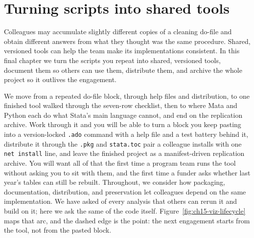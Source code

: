 \documentclass[
    a4paper,
    fontsize=10pt,
    twoside=true,
    numbers=noenddot,
]{kaobook}
\begin{document}
\chapter{Turning scripts into shared tools}\label{ch:tools}

Colleagues may accumulate slightly different copies of a cleaning do-file and obtain different answers from what they thought was the same procedure. Shared, versioned tools can help the team make its implementations consistent. In this final chapter we turn the scripts you repeat into shared, versioned tools, document them so others can use them, distribute them, and archive the whole project so it outlives the engagement.

We move from a repeated do-file block, through help files and distribution, to one finished tool walked through the seven-row checklist, then to where Mata and Python each do what Stata's main language cannot, and end on the replication archive. Work through it and you will be able to turn a block you keep pasting into a version-locked \texttt{.ado} command with a help file and a test battery behind it, distribute it through the \texttt{.pkg} and \texttt{stata.toc} pair a colleague installs with one \texttt{net install} line, and leave the finished project as a manifest-driven replication archive. You will want all of that the first time a program team runs the tool without asking you to sit with them, and the first time a funder asks whether last year's tables can still be rebuilt. Throughout, we consider how packaging, documentation, distribution, and preservation let colleagues depend on the same implementation. We have asked of every analysis that others can rerun it and build on it; here we ask the same of the code itself. Figure~\ref{fig:ch15-viz-lifecycle} maps that arc, and the dashed edge is the point: the next engagement starts from the tool, not from the pasted block.
\end{document}
